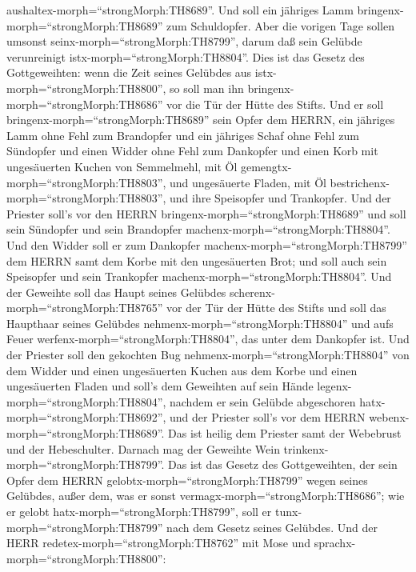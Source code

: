 aushaltex-morph=``strongMorph:TH8689''. Und soll ein jähriges Lamm
bringenx-morph=``strongMorph:TH8689'' zum Schuldopfer. Aber die vorigen
Tage sollen umsonst seinx-morph=``strongMorph:TH8799'', darum daß sein
Gelübde verunreinigt istx-morph=``strongMorph:TH8804''. 
Dies ist das Gesetz des Gottgeweihten: wenn die Zeit seines Gelübdes aus
istx-morph=``strongMorph:TH8800'', so soll man ihn
bringenx-morph=``strongMorph:TH8686'' vor die Tür der Hütte des Stifts.
 Und er soll bringenx-morph=``strongMorph:TH8689'' sein
Opfer dem HERRN, ein jähriges Lamm ohne Fehl zum Brandopfer und ein
jähriges Schaf ohne Fehl zum Sündopfer und einen Widder ohne Fehl zum
Dankopfer  und einen Korb mit ungesäuerten Kuchen von
Semmelmehl, mit Öl gemengtx-morph=``strongMorph:TH8803'', und
ungesäuerte Fladen, mit Öl bestrichenx-morph=``strongMorph:TH8803'', und
ihre Speisopfer und Trankopfer.  Und der Priester soll's
vor den HERRN bringenx-morph=``strongMorph:TH8689'' und soll sein
Sündopfer und sein Brandopfer machenx-morph=``strongMorph:TH8804''.
 Und den Widder soll er zum Dankopfer
machenx-morph=``strongMorph:TH8799'' dem HERRN samt dem Korbe mit den
ungesäuerten Brot; und soll auch sein Speisopfer und sein Trankopfer
machenx-morph=``strongMorph:TH8804''.  Und der Geweihte
soll das Haupt seines Gelübdes scherenx-morph=``strongMorph:TH8765'' vor
der Tür der Hütte des Stifts und soll das Haupthaar seines Gelübdes
nehmenx-morph=``strongMorph:TH8804'' und aufs Feuer
werfenx-morph=``strongMorph:TH8804'', das unter dem Dankopfer ist.
 Und der Priester soll den gekochten Bug
nehmenx-morph=``strongMorph:TH8804'' von dem Widder und einen
ungesäuerten Kuchen aus dem Korbe und einen ungesäuerten Fladen und
soll's dem Geweihten auf sein Hände legenx-morph=``strongMorph:TH8804'',
nachdem er sein Gelübde abgeschoren hatx-morph=``strongMorph:TH8692'',
 und der Priester soll's vor dem HERRN
webenx-morph=``strongMorph:TH8689''. Das ist heilig dem Priester samt
der Webebrust und der Hebeschulter. Darnach mag der Geweihte Wein
trinkenx-morph=``strongMorph:TH8799''.  Das ist das Gesetz
des Gottgeweihten, der sein Opfer dem HERRN
gelobtx-morph=``strongMorph:TH8799'' wegen seines Gelübdes, außer dem,
was er sonst vermagx-morph=``strongMorph:TH8686''; wie er gelobt
hatx-morph=``strongMorph:TH8799'', soll er
tunx-morph=``strongMorph:TH8799'' nach dem Gesetz seines Gelübdes.
 Und der HERR redetex-morph=``strongMorph:TH8762'' mit Mose
und sprachx-morph=``strongMorph:TH8800'': 
